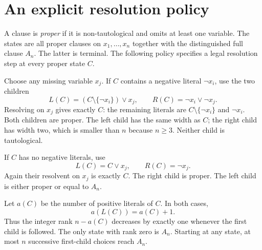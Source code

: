 \documentclass[11pt]{article}
\begin{document}
\section{An explicit resolution policy}
A clause is \emph{proper} if it is non-tautological and omits at least one variable. The states are all proper clauses on $x_1,\ldots,x_n$ together with the distinguished full clause $A_n$. The latter is terminal. The following policy specifies a legal resolution step at every proper state $C$.

Choose any missing variable $x_j$. If $C$ contains a negative literal $\neg x_i$, use the two children
\begin{equation}\label{eq:negative}
 L(C)=(C\setminus\{\neg x_i\})\vee x_j,
 \qquad R(C)=\neg x_i\vee\neg x_j.
\end{equation}
Resolving on $x_j$ gives exactly $C$: the remaining literals are $C\setminus\{\neg x_i\}$ and $\neg x_i$. Both children are proper. The left child has the same width as $C$; the right child has width two, which is smaller than $n$ because $n\ge3$. Neither child is tautological.

If $C$ has no negative literals, use
\begin{equation}\label{eq:positive}
 L(C)=C\vee x_j,\qquad R(C)=\neg x_j.
\end{equation}
Again their resolvent on $x_j$ is exactly $C$. The right child is proper. The left child is either proper or equal to $A_n$.

Let $a(C)$ be the number of positive literals of $C$. In both cases,
\[
 a(L(C))=a(C)+1.
\]
Thus the integer rank $n-a(C)$ decreases by exactly one whenever the first child is followed. The only state with rank zero is $A_n$. Starting at any state, at most $n$ successive first-child choices reach $A_n$.
\end{document}
